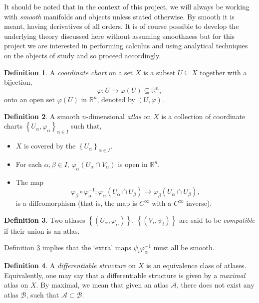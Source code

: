 \documentclass[12pt,a4paper]{article}
\numberwithin{equation}{section}
\theoremstyle{definition}
\newtheorem{definition}{Definition}[section]
\theoremstyle{remark}
\begin{document}
It should be noted that in the context of this project, we will always be working with \textit{smooth} manifolds and objects unless stated otherwise. By smooth it is meant, having derivatives of all orders. It is of course possible to develop the underlying theory discussed here without assuming smoothness but for this project we are interested in performing calculus and using analytical techniques on the objects of study and so proceed accordingly.
\begin{definition}
A \textit{coordinate chart} on a set $X$ is a subset $U\subseteq X$ together with a bijection, $$\varphi :U\to\varphi(U)\subseteq\mathbb{R}^n,$$ onto an open set $\varphi(U)$ in $\mathbb{R}^n$, denoted by $(U,\varphi)$.
\end{definition}
\begin{definition}
A smooth $n$-dimensional \textit{atlas} on $X$ is a collection of coordinate charts $\left\{U_\alpha,\varphi_\alpha\right\}_{\alpha\in I}$ such that,
\begin{itemize}
\item $X$ is covered by the $\left\{U_\alpha\right\}_{\alpha\in I}$.
\item For each $\alpha,\beta\in I$, $\varphi_\alpha\left(U_\alpha\cap V_\alpha\right)$ is open in $\mathbb{R}^n$.
\item The map $$\varphi_\beta\circ\varphi_{\alpha}^{-1}:\varphi_\alpha\left(U_\alpha\cap U_\beta\right)\to\varphi_\beta\left(U_\alpha\cap U_\beta\right),$$ is a diffeomorphism (that is, the map is $C^{\infty}$ with a $C^{\infty}$ inverse).
\end{itemize}
\end{definition}
\begin{definition}
\label{def:atlas-compat}
Two atlases $\left\{\left(U_\alpha,\varphi_\alpha \right) \right\}$, $\left\{\left(V_i,\psi_i \right) \right\}$ are said to be \textit{compatible} if their union is an atlas.
\end{definition}
Definition \ref{def:atlas-compat} implies that the `extra' maps $\psi_i\varphi^{-1}_\alpha$ must all be smooth.
\begin{definition}
A \textit{differentiable structure} on $X$ is an equivalence class of atlases. Equivalently, one may say that a differentiable structure is given by a \textit{maximal} atlas on $X$. By maximal, we mean that given an atlas $\mathcal{A}$, there does not exist any atlas $\mathcal{B}$, such that $\mathcal{A}\subset \mathcal{B}$. 
\end{definition}
\end{document}
